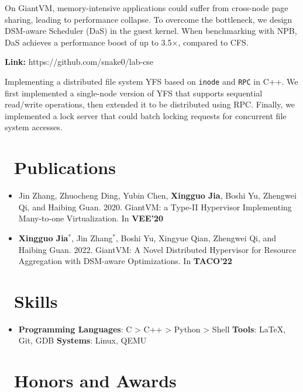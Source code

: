 \documentclass{resume}
\begin{document}
On GiantVM, memory-intensive applications could suffer from cross-node page sharing, leading to performance collapse. To overcome the bottleneck, we design DSM-aware Scheduler (DaS) in the guest kernel. When benchmarking with NPB, DaS achieves a performance boost of up to 3.5$\times$, compared to CFS. 

\textbf{Link:} https://github.com/snake0/lab-cse

Implementing a distributed file system YFS based on \texttt{inode} and \texttt{RPC} in C++. We first implemented a single-node version of YFS that supports sequential read/write operations, then extended it to be distributed using RPC. Finally, we implemented a lock server that could batch locking requests for concurrent file system accesses.

\section{\faGraduationCap\ Publications}
\begin{itemize}
\item Jin Zhang, Zhuocheng Ding, Yubin Chen, \textbf{Xingguo Jia}, Boshi Yu, Zhengwei Qi, and Haibing Guan. 2020. GiantVM: a Type-II Hypervisor Implementing Many-to-one Virtualization. In \textbf{VEE'20}
\item \textbf{Xingguo Jia$^*$}, Jin Zhang$^*$, Boshi Yu, Xingyue Qian, Zhengwei Qi, and Haibing Guan. 2022. GiantVM: A Novel Distributed Hypervisor for Resource Aggregation with DSM-aware Optimizations. In \textbf{TACO'22}
\end{itemize}

\section{\faCogs\ Skills}
\begin{itemize}[parsep=0.5ex]
  \item \textbf{Programming Languages}: C > C++ > Python > Shell \textbf{Tools}: \LaTeX, Git, GDB \textbf{Systems}: Linux, QEMU
\end{itemize}

\section{\faHeartO\ Honors and Awards}
\end{document}
